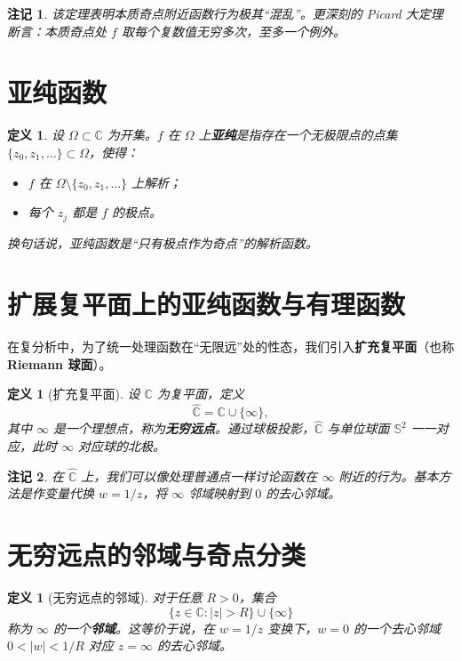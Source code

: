 \documentclass[UTF8]{ctexart}
\newtheorem{definition}[theorem]{定义}
\newtheorem{remark}{注记}[section]
\numberwithin{equation}{section}
\newcommand{\CC}{\mathbb{C}}
\begin{document}
\begin{remark}
该定理表明本质奇点附近函数行为极其“混乱”。更深刻的 Picard 大定理断言：本质奇点处 \(f\) 取每个复数值无穷多次，至多一个例外。
\end{remark}

\section{亚纯函数}
\begin{definition}
设 \(\Omega\subset\CC\) 为开集。\(f\) 在 \(\Omega\) 上\textbf{亚纯}是指存在一个无极限点的点集 \(\{z_0,z_1,\dots\}\subset\Omega\)，使得：
\begin{itemize}
\item \(f\) 在 \(\Omega\setminus\{z_0,z_1,\dots\}\) 上解析；
\item 每个 \(z_j\) 都是 \(f\) 的极点。
\end{itemize}
换句话说，亚纯函数是“只有极点作为奇点”的解析函数。
\end{definition}

\section{扩展复平面上的亚纯函数与有理函数}



在复分析中，为了统一处理函数在“无限远”处的性态，我们引入\textbf{扩充复平面}（也称\textbf{Riemann 球面}）。

\begin{definition}[扩充复平面]
设 $\CC$ 为复平面，定义
\[
\widehat{\CC} = \CC \cup \{\infty\},
\]
其中 $\infty$ 是一个理想点，称为\textbf{无穷远点}。通过球极投影，$\widehat{\CC}$ 与单位球面 $\mathbb{S}^2$ 一一对应，此时 $\infty$ 对应球的北极。
\end{definition}

\begin{remark}
在 $\widehat{\CC}$ 上，我们可以像处理普通点一样讨论函数在 $\infty$ 附近的行为。基本方法是作变量代换 $w = 1/z$，将 $\infty$ 邻域映射到 $0$ 的去心邻域。
\end{remark}

\section{无穷远点的邻域与奇点分类}

\begin{definition}[无穷远点的邻域]
对于任意 $R > 0$，集合
\[
\{z \in \CC : |z| > R\} \cup \{\infty\}
\]
称为 $\infty$ 的一个\textbf{邻域}。这等价于说，在 $w = 1/z$ 变换下，$w=0$ 的一个去心邻域 $0 < |w| < 1/R$ 对应 $z = \infty$ 的去心邻域。
\end{definition}
\end{document}
